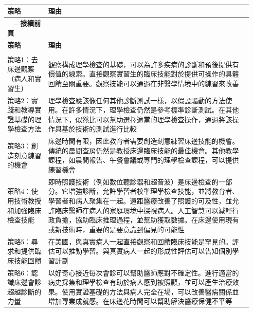 \documentclass[12pt,a4paper]{article}
\begin{document}
\begin{longtable}{>{\raggedright\arraybackslash}p{4cm} >{\raggedright\arraybackslash}p{11cm}}
\toprule
\textbf{\textcolor{emergency_red}{策略}} & \textbf{\textcolor{emergency_red}{理由}} \\
\midrule
\endfirsthead

\multicolumn{2}{c}%
{{\bfseries \tablename\ \thetable{} -- 接續前頁}} \\
\toprule
\textbf{\textcolor{emergency_red}{策略}} & \textbf{\textcolor{emergency_red}{理由}} \\
\midrule
\endhead

\midrule \multicolumn{2}{r}{{接續下頁}} \\ \midrule
\endfoot

\bottomrule
\endlastfoot

\textcolor{emergency_blue}{策略1：去床邊觀察（病人和實習生）} & 觀察構成理學檢查的基礎，可以為許多疾病的診斷和預後提供有價值的線索。直接觀察實習生的臨床技能對於提供可操作的具體回饋至關重要。觀察技能可以通過在非醫學情境中的練習來改善 \\

\textcolor{emergency_blue}{策略2：實踐和教導實證基礎的理學檢查方法} & 理學檢查應該像任何其他診斷測試一樣，以假設驅動的方法使用。在許多情況下，理學檢查仍然是參考標準診斷測試。在其他情況下，似然比可以幫助選擇適當的理學檢查操作，通過將該操作與基於技術的測試進行比較 \\

\textcolor{emergency_blue}{策略3：創造刻意練習的機會} & 床邊時間有限，因此教育者需要創造刻意練習床邊技能的機會。傳統的晨間查房仍然是教授床邊臨床技能的最佳機會。其他教學課程，如晨間報告、午餐會議或專門的理學檢查課程，可以提供練習機會 \\

\textcolor{emergency_blue}{策略4：使用技術教授和加強臨床檢查技能} & 即時照護技術（例如數位聽診器和超音波）是床邊檢查的一部分。它增強診斷，允許學習者校準理學檢查技能，並將教育者、學習者和病人聚集在一起。遠距醫療改善了照護的可及性，並允許臨床醫師在病人的家庭環境中探視病人。人工智慧可以減輕行政負擔，協助臨床推理過程，並幫助獲取數據。在床邊使用現有或新技術時，重要的是要意識到偏見的可能性 \\

\textcolor{emergency_blue}{策略5：尋求和提供臨床技能回饋} & 在美國，與真實病人一起直接觀察和回饋臨床技能是罕見的。評估可以推動學習。與真實病人一起的形成性評估可以告知個別學習計劃 \\

\textcolor{emergency_blue}{策略6：認識床邊會診超越診斷的力量} & 以好奇心接近每次會診可以幫助醫師應對不確定性。進行適當的病史採集和理學檢查有助於病人感到被照顧，並可以產生治療效果。使用實證基礎的方法與病人完全在場，可以改善醫病關係並增加專業成就感。在床邊花時間可以幫助解決醫療保健不平等 \\
\end{longtable}
\end{document}
